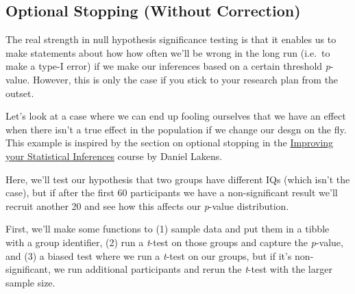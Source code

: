 \documentclass[
]{book}
\begin{document}
\hypertarget{optional-stopping-without-correction}{%
\subsection{Optional Stopping (Without Correction)}\label{optional-stopping-without-correction}}

The real strength in null hypothesis significance testing is that it enables us to make statements about how how often we'll be wrong in the long run (i.e.~to make a type-I error) if we make our inferences based on a certain threshold \emph{p}-value. However, this is only the case if you stick to your research plan from the outset.

Let's look at a case where we can end up fooling ourselves that we have an effect when there isn't a true effect in the population if we change our desgn on the fly. This example is inspired by the section on optional stopping in the \href{https://www.coursera.org/learn/statistical-inferences}{Improving your Statistical Inferences} course by Daniel Lakens.

Here, we'll test our hypothesis that two groups have different IQs (which isn't the case), but if after the first 60 participants we have a non-significant result we'll recruit another 20 and see how this affects our \emph{p}-value distribution.

First, we'll make some functions to (1) sample data and put them in a tibble with a group identifier, (2) run a \emph{t}-test on those groups and capture the \emph{p}-value, and (3) a biased test where we run a \emph{t}-test on our groups, but if it's non-significant, we run additional participants and rerun the \emph{t}-test with the larger sample size.
\end{document}

